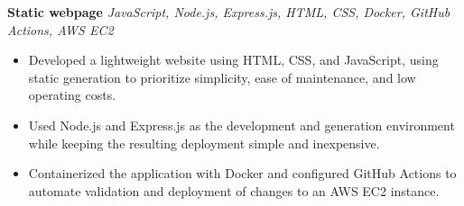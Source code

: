 \textbf{Static webpage} \hfill \textit{JavaScript, Node.js, Express.js, HTML, CSS, Docker, GitHub Actions, AWS EC2}

\begin{itemize}
    \item Developed a lightweight website using HTML, CSS, and JavaScript, using static generation to prioritize simplicity, ease of maintenance, and low operating costs.
    \item Used Node.js and Express.js as the development and generation environment while keeping the resulting deployment simple and inexpensive.
    \item Containerized the application with Docker and configured GitHub Actions to automate validation and deployment of changes to an AWS EC2 instance.
\end{itemize}
